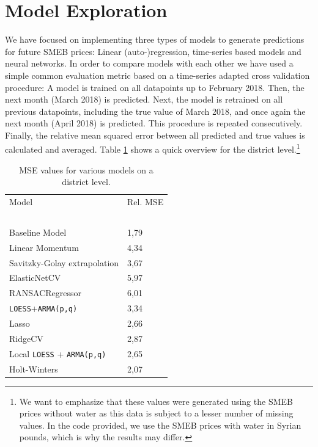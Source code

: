 \documentclass[11pt,a4paper]{article}
\begin{document}
	\section*{Model Exploration}
	We have focused on implementing three types of models to generate predictions for future SMEB prices: Linear (auto-)regression, time-series based models and neural networks. In order to compare models with each other we have used a simple common evaluation metric based on a time-series adapted cross validation procedure: A model is trained on all datapoints up to February 2018. Then, the next month (March 2018) is predicted. Next, the model is retrained on all previous datapoints, including the true value of March 2018, and once again the next month (April 2018) is predicted. This procedure is repeated consecutively. Finally, the relative mean squared error between all predicted and true values is calculated and averaged. Table \ref{fig:numbers} shows a quick overview for the district level.\footnote{We want to emphasize that these values were generated using the SMEB prices without water as this data is subject to a lesser number of missing values. In the code provided, we use the SMEB prices with water in Syrian pounds, which is why the results may differ.}
	
	\begin{table}
		\centering
		\begin{tabular}{|l|l|}
			\cline{1-2}
			Model & Rel. MSE \\ \cline{1-2}
			~ & ~ \\[-4.6mm]
			\rowcolor{green} Baseline Model & 1,79 \\
			\rowcolor{red} Linear Momentum & 4,34 \\
			\rowcolor{red} Savitzky-Golay extrapolation & 3,67 \\
			\rowcolor{red} ElasticNetCV & 5,97 \\
			\rowcolor{red} RANSACRegressor & 6,01 \\
			\rowcolor{red} \texttt{LOESS}+\texttt{ARMA(p,q)} & 3,34 \\
			\rowcolor{orange} Lasso & 2,66 \\
			\rowcolor{orange} RidgeCV & 2,87 \\
			\rowcolor{yellow} Local \texttt{LOESS} + \texttt{ARMA(p,q)} & 2,65 \\
			\rowcolor{yellow} Holt-Winters & 2,07 \\
			\cline{1-2}
		\end{tabular}
		\caption{MSE values for various models on a district level.} \label{fig:numbers}
	\end{table}
	
\end{document}
